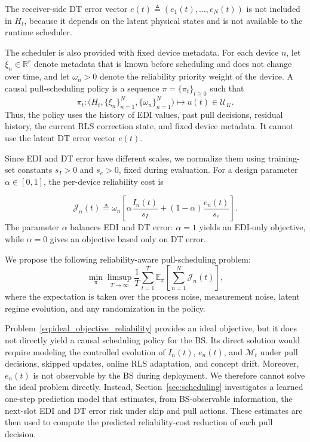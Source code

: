 \documentclass[conference]{IEEEtran}
\begin{document}
\noindent The receiver-side DT error vector
\(
e(t)\triangleq(e_1(t),\ldots,e_N(t))
\)
is not included in \(H_t\), because it depends on the latent physical states
and is not available to the runtime scheduler.

The scheduler is also provided with fixed device metadata. For each device
\(n\), let \(\xi_n\in\mathbb R^{r}\) denote metadata that is known before
scheduling and does not change over time, and let \(\omega_n>0\) denote the
reliability priority weight of the device. A causal pull-scheduling policy is
a sequence \(\pi=\{\pi_t\}_{t\ge0}\) such that
\[
\pi_t:
\big(
H_t,
\{\xi_n\}_{n=1}^{N},
\{\omega_n\}_{n=1}^{N}
\big)
\mapsto
u(t)\in\mathcal U_K .
\]
Thus, the policy uses the history of EDI values, past pull decisions, residual history,
the current RLS correction state, and fixed device metadata. It cannot use
the latent DT error vector \(e(t)\).

Since EDI and DT error have different scales, we normalize them using
training-set constants \(s_I>0\) and \(s_e>0\), fixed during evaluation. For a design parameter \(\alpha\in[0,1]\), the
per-device reliability cost is
\vspace{-4mm}

\begin{equation}
\label{eq:reliability_cost_system}
\mathcal J_n(t)
\triangleq
\omega_n
\left[
\alpha \frac{I_n(t)}{s_I}
+
(1-\alpha)\frac{e_n(t)}{s_e}
\right].
\end{equation}
The parameter \(\alpha\) balances EDI and DT error:
\(\alpha=1\) yields an EDI-only objective, while \(\alpha=0\) gives an objective based only on DT error.

We propose the following reliability-aware pull-scheduling problem:
\vspace{-4mm}
\begin{equation}
\label{eq:ideal_objective_reliability}
\min_{\pi}
\limsup_{T\to\infty}
\frac{1}{T}
\sum_{t=1}^{T}
\mathbb E_{\pi}
\left[
\sum_{n=1}^{N}\mathcal J_n(t)
\right],
\end{equation}
where the expectation is taken over the process noise, measurement noise,
latent regime evolution, and any randomization in the policy.

Problem~\eqref{eq:ideal_objective_reliability} provides an ideal objective,
but it does not directly yield a causal scheduling policy for the BS. Its direct
solution would require modeling the controlled evolution of \(I_n(t)\),
\(e_n(t)\), and \(\mathcal M_t\) under pull decisions, skipped updates,
online RLS adaptation, and concept drift. Moreover, \(e_n(t)\) is not
observable by the BS during deployment. We therefore cannot solve the ideal
problem directly. Instead, Section~\ref{sec:scheduling} investigates a learned
one-step prediction model that estimates, from BS-observable information, the
next-slot EDI and DT error risk under skip and pull actions. These estimates
are then used to compute the predicted reliability-cost reduction of each pull
decision.
\vspace{-1.02mm}
\end{document}
